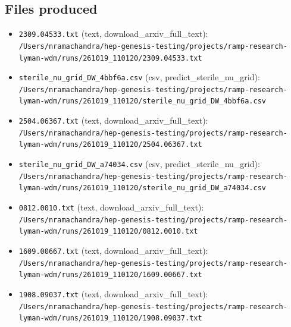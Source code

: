 \documentclass[11pt,a4paper]{article}
\begin{document}
\subsection{Files produced}
\begin{itemize}
  \item \texttt{2309.04533.txt} (text, download\_arxiv\_full\_text): \texttt{/\allowbreak{}Users/\allowbreak{}nramachandra/\allowbreak{}hep-genesis-testing/\allowbreak{}projects/\allowbreak{}ramp-research-lyman-wdm/\allowbreak{}runs/\allowbreak{}261019\_\allowbreak{}110120/\allowbreak{}2309.04533.txt}
  \item \texttt{sterile\_\allowbreak{}nu\_\allowbreak{}grid\_\allowbreak{}DW\_\allowbreak{}4bbf6a.csv} (csv, predict\_sterile\_nu\_grid): \texttt{/\allowbreak{}Users/\allowbreak{}nramachandra/\allowbreak{}hep-genesis-testing/\allowbreak{}projects/\allowbreak{}ramp-research-lyman-wdm/\allowbreak{}runs/\allowbreak{}261019\_\allowbreak{}110120/\allowbreak{}sterile\_\allowbreak{}nu\_\allowbreak{}grid\_\allowbreak{}DW\_\allowbreak{}4bbf6a.csv}
  \item \texttt{2504.06367.txt} (text, download\_arxiv\_full\_text): \texttt{/\allowbreak{}Users/\allowbreak{}nramachandra/\allowbreak{}hep-genesis-testing/\allowbreak{}projects/\allowbreak{}ramp-research-lyman-wdm/\allowbreak{}runs/\allowbreak{}261019\_\allowbreak{}110120/\allowbreak{}2504.06367.txt}
  \item \texttt{sterile\_\allowbreak{}nu\_\allowbreak{}grid\_\allowbreak{}DW\_\allowbreak{}a74034.csv} (csv, predict\_sterile\_nu\_grid): \texttt{/\allowbreak{}Users/\allowbreak{}nramachandra/\allowbreak{}hep-genesis-testing/\allowbreak{}projects/\allowbreak{}ramp-research-lyman-wdm/\allowbreak{}runs/\allowbreak{}261019\_\allowbreak{}110120/\allowbreak{}sterile\_\allowbreak{}nu\_\allowbreak{}grid\_\allowbreak{}DW\_\allowbreak{}a74034.csv}
  \item \texttt{0812.0010.txt} (text, download\_arxiv\_full\_text): \texttt{/\allowbreak{}Users/\allowbreak{}nramachandra/\allowbreak{}hep-genesis-testing/\allowbreak{}projects/\allowbreak{}ramp-research-lyman-wdm/\allowbreak{}runs/\allowbreak{}261019\_\allowbreak{}110120/\allowbreak{}0812.0010.txt}
  \item \texttt{1609.00667.txt} (text, download\_arxiv\_full\_text): \texttt{/\allowbreak{}Users/\allowbreak{}nramachandra/\allowbreak{}hep-genesis-testing/\allowbreak{}projects/\allowbreak{}ramp-research-lyman-wdm/\allowbreak{}runs/\allowbreak{}261019\_\allowbreak{}110120/\allowbreak{}1609.00667.txt}
  \item \texttt{1908.09037.txt} (text, download\_arxiv\_full\_text): \texttt{/\allowbreak{}Users/\allowbreak{}nramachandra/\allowbreak{}hep-genesis-testing/\allowbreak{}projects/\allowbreak{}ramp-research-lyman-wdm/\allowbreak{}runs/\allowbreak{}261019\_\allowbreak{}110120/\allowbreak{}1908.09037.txt}

\end{itemize}
\end{document}
